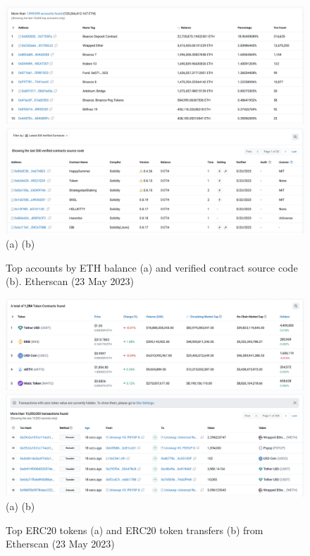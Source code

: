 \documentclass[UTF8]{article}
\begin{document}
\begin{figure}[htbp]
\begin{center}
\includegraphics[width=0.48\linewidth]{images/accounts}
\includegraphics[width=0.48\linewidth]{images/contracts} \\
(a)\hspace{160pt}        (b)\\
\caption{Top accounts by ETH balance (a) and verified contract source code (b). Etherscan (23 May 2023)}
\label{fig:accounts}
\end{center}
\end{figure}

\begin{figure}[htbp]
\begin{center}
\includegraphics[width=0.48\linewidth]{images/erc20}
\includegraphics[width=0.48\linewidth]{images/xfrs} \\
(a)\hspace{160pt}        (b)\\
\caption{Top ERC20 tokens (a) and ERC20 token transfers (b) from Etherscan (23 May 2023)}
\label{fig:erc20}
\end{center}
\end{figure}
\end{document}
